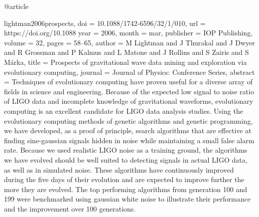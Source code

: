 @article{lightman2006prospects,
	doi = {10.1088/1742-6596/32/1/010},
	url = {https://doi.org/10.1088%
	year = 2006,
	month = {mar},
	publisher = {{IOP} Publishing},
	volume = {32},
	pages = {58--65},
	author = {M Lightman and J Thurakal and J Dwyer and R Grossman and P Kalmus and L Matone and J Rollins and S Zairis and S M{\'{a}}rka},
	title = {Prospects of gravitational wave data mining and exploration via evolutionary computing},
	journal = {Journal of Physics: Conference Series},
	abstract = {Techniques of evolutionary computing have proven useful for a diverse array of fields in science and engineering. Because of the expected low signal to noise ratio of LIGO data and incomplete knowledge of gravitational waveforms, evolutionary computing is an excellent candidate for LIGO data analysis studies. Using the evolutionary computing methods of genetic algorithms and genetic programming, we have developed, as a proof of principle, search algorithms that are effective at finding sine-gaussian signals hidden in noise while maintaining a small false alarm rate. Because we used realistic LIGO noise as a training ground, the algorithms we have evolved should be well suited to detecting signals in actual LIGO data, as well as in simulated noise. These algorithms have continuously improved during the five days of their evolution and are expected to improve further the more they are evolved. The top performing algorithms from generation 100 and 199 were benchmarked using gaussian white noise to illustrate their performance and the improvement over 100 generations.}
}

}
